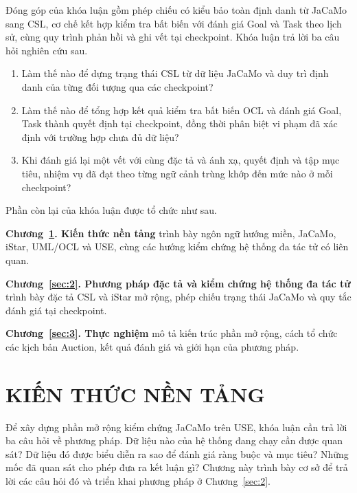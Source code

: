 \documentclass[12pt,a4paper,oneside]{extreport}
\begin{document}
Đóng góp của khóa luận gồm phép chiếu có kiểu bảo toàn định danh từ JaCaMo sang CSL, cơ chế kết hợp kiểm tra bất biến với đánh giá Goal và Task theo lịch sử, cùng quy trình phản hồi và ghi vết tại checkpoint. Khóa luận trả lời ba câu hỏi nghiên cứu sau.

\begin{enumerate}
\def\labelenumi{\roman{enumi})}
\item
  Làm thế nào để dựng trạng thái CSL từ dữ liệu JaCaMo và duy trì định danh của từng đối tượng qua các checkpoint?
\item
  Làm thế nào để tổng hợp kết quả kiểm tra bất biến OCL và đánh giá Goal, Task thành quyết định tại checkpoint, đồng thời phân biệt vi phạm đã xác định với trường hợp chưa đủ dữ liệu?
\item
  Khi đánh giá lại một vết với cùng đặc tả và ánh xạ, quyết định và tập mục tiêu, nhiệm vụ đã đạt theo từng ngữ cảnh trùng khớp đến mức nào ở mỗi checkpoint?
\end{enumerate}

\begin{samepage}
Phần còn lại của khóa luận được tổ chức như sau.

\textbf{Chương~\ref{sec:1}. Kiến thức nền tảng} trình bày ngôn ngữ hướng miền, JaCaMo, iStar, UML/OCL và USE, cùng các hướng kiểm chứng hệ thống đa tác tử có liên quan.

\textbf{Chương~\ref{sec:2}. Phương pháp đặc tả và kiểm chứng hệ thống đa tác tử} trình bày đặc tả CSL và iStar mở rộng, phép chiếu trạng thái JaCaMo và quy tắc đánh giá tại checkpoint.

\textbf{Chương~\ref{sec:3}. Thực nghiệm} mô tả kiến trúc phần mở rộng, cách tổ chức các kịch bản Auction, kết quả đánh giá và giới hạn của phương pháp.
\end{samepage}

\clearpage
{}

\chapter{KIẾN THỨC NỀN TẢNG}\label{sec:1}

Để xây dựng phần mở rộng kiểm chứng JaCaMo trên USE, khóa luận cần trả lời ba câu hỏi về phương pháp. Dữ liệu nào của hệ thống đang chạy cần được quan sát? Dữ liệu đó được biểu diễn ra sao để đánh giá ràng buộc và mục tiêu? Những mốc đã quan sát cho phép đưa ra kết luận gì? Chương này trình bày cơ sở để trả lời các câu hỏi đó và triển khai phương pháp ở Chương~\ref{sec:2}.
\end{document}
